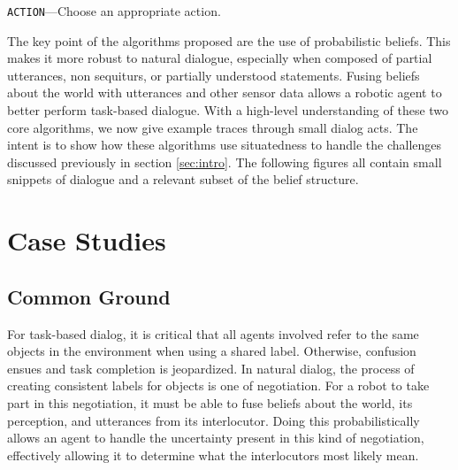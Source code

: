 \documentclass[12pt]{article}
\begin{document}
\begin{algorithm}
  \DontPrintSemicolon
  \caption{ \texttt{ACTION}---Choose an appropriate action.}
  \label{algo:action}
\end{algorithm}

The key point of the algorithms proposed are the use of probabilistic
beliefs. This makes it more robust to natural dialogue, especially
when composed of partial utterances, non sequiturs, or partially
understood statements. Fusing beliefs about the world with utterances
and other sensor data allows a robotic agent to better perform
task-based dialogue. With a high-level understanding of these two core
algorithms, we now give example traces through small dialog acts. The
intent is to show how these algorithms use situatedness to handle the
challenges discussed previously in section \ref{sec:intro}. The
following figures all contain small snippets of dialogue and a
relevant subset of the belief structure.

\section{Case Studies}
\label{sec:case_studies}
\subsection{Common Ground}
For task-based dialog, it is critical that all agents involved refer
to the same objects in the environment when using a shared
label. Otherwise, confusion ensues and task completion is
jeopardized. In natural dialog, the process of creating consistent
labels for objects is one of negotiation. For a robot to take part in
this negotiation, it must be able to fuse beliefs about the world, its
perception, and utterances from its interlocutor. Doing this
probabilistically allows an agent to handle the uncertainty present in
this kind of negotiation, effectively allowing it to determine what
the interlocutors most likely mean.
\end{document}
